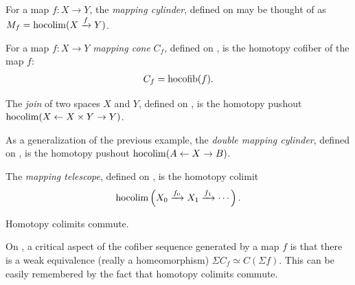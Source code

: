 \begin{example} For a map $f: X\to Y$, the \textit{mapping cylinder}, defined on \cite[p.2]{hatcher} may be thought of as $M_f = \mathop{\operatorname*{hocolim}}(X \xrightarrow{f} Y)$.
\end{example}


\begin{example} For a map $f: X\to Y$ \textit{mapping cone} $C_f$, defined on \cite[p.13]{hatcher}, is the homotopy cofiber of the map $f$:
\begin{align*}
    C_f = \text{hocofib}(f).
\end{align*}
\end{example}

\begin{example} The \textit{join} of two spaces $X$ and $Y$, defined on \cite[p.9]{hatcher}, is the homotopy pushout $\mathop{\operatorname*{hocolim}}(X \leftarrow X\times Y \to Y)$.
\end{example}

\begin{example} As a generalization of the previous example, the \textit{double mapping cylinder}, defined on \cite[p.80]{may}, is the homotopy pushout $\mathop{\operatorname*{hocolim}}( A \leftarrow X \to B)$.
\end{example}

\begin{example} The \textit{mapping telescope}, defined on \cite[p.138]{hatcher}, is the homotopy colimit
\begin{align*}
    \mathop{\operatorname*{hocolim}}\left(X_0 \xrightarrow{f_0} X_1 \xrightarrow{f_1} \cdots \right).
\end{align*}

\end{example}




\begin{theorem} \cite[Theorem~24.9]{chacholski} Homotopy colimits commute.
\end{theorem}

\begin{corollary} On \cite[p.57]{may}, a critical aspect of the cofiber sequence generated by a map $f$ is that there is a weak equivalence (really a homeomorphism) $\Sigma C_f \simeq C(\Sigma f)$. This can be easily remembered by the fact that homotopy colimits commute.
\end{corollary}


